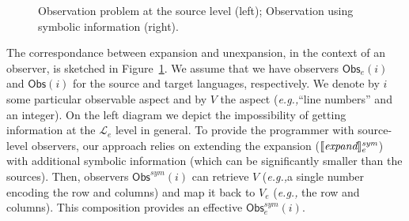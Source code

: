 \documentclass[preprint]{llncs}
\newcommand{\eg}{\emph{e.g.,\xspace}}
\begin{document}
\begin{figure}[t]
    \centering
    \begin{minipage}{0.45\linewidth}
    \end{minipage}
    \begin{minipage}{0.45\linewidth}
    \end{minipage}
    \caption{Observation problem at the source level (left);
      Observation using symbolic information (right).}
    \label{fig:unexpansion}
\end{figure} 

The correspondance between expansion and unexpansion, in the context
of an observer, is sketched in Figure~\ref{fig:unexpansion}. We assume
that we have observers $\textsf{Obs}_e(i)$ and $\textsf{Obs}(i)$ for
the source and target languages, respectively. We denote by $i$ some
particular observable aspect and by $V$ the aspect (\eg ``line
numbers'' and an integer). On the left diagram we depict the
impossibility of getting information at the $\mathcal{L}_e$ level in
general. 
To provide the programmer with source-level observers, our approach
relies on extending the expansion ($\llbracket \textit{expand} \rrbracket^{\textit{sym}}_e$)
with additional symbolic information (which can be significantly 
smaller than the sources). Then, observers
$\textsf{Obs}^{\textit{sym}}(i)$ can retrieve $V$ (\eg a single
number encoding the row and columns) and map it back to $V_e$ (\eg
the row and columns). This composition provides an effective
$\textsf{Obs}^{\textit{sym}}_e(i)$.
\end{document}
